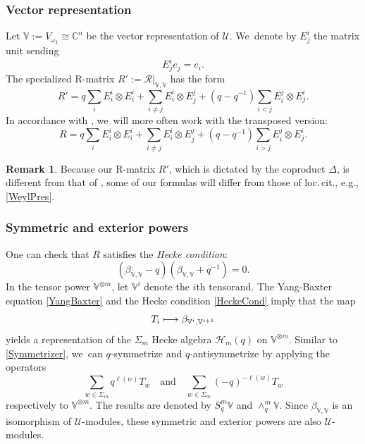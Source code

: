 \documentclass[11pt]{article}
\newcommand{\eg}{e.g.,\xspace}
\newcommand\mto{\mathchoice{\longmapsto}{\mapsto}{\mapsto}{\mapsto}}
\theoremstyle{definition}
\newtheorem{rem}[thm]{Remark}
\newcommand{\CC}{\mathbb{C}}
\newcommand{\Hecke}{\mathcal{H}}
\begin{document}
\subsubsection{Vector representation}
Let $\mathbb{V}:=V_{\omega_1}\cong \CC^n$ be the vector representation of $\mathcal{U}$. We~denote by $E_j^i$ the matrix unit sending
\[
E_{j}^ie_j=e_i.
\]
The specialized R-matrix $R':=\mathcal{R}\big|_{\mathbb{V},\mathbb{V}}$ has the form
\begin{equation*}
R'=q\sum_i E_{i}^i\otimes E_{i}^i+\sum_{i\not=j}E_{i}^i\otimes E_{j}^j+(q-q^{-1})\sum_{i<j}E_{i}^j\otimes E_{j}^i.
\end{equation*}
In accordance with \cite{JordanMult}, we~will more often work with the transposed version:
\begin{equation}
R=q\sum_i E_{i}^i\otimes E_{i}^i+\sum_{i\not=j}E_{i}^i\otimes E_{j}^j+(q-q^{-1})\sum_{i>j}E_{i}^j\otimes E_{j}^i.
\label{VecRMatrix}
\end{equation}

\begin{rem}
Because our R-matrix $R'$, which is dictated by the coproduct $\Delta$, is different from that of \cite{JordanMult}, some of our formulas will differ from those of loc.\,cit., \eg \eqref{WeylPres}.
\end{rem}

\subsubsection{Symmetric and exterior powers}
One can check that $R$ satisfies the \textit{Hecke condition}:
\begin{equation}
(\beta_{\mathbb{V},\mathbb{V}}-q)(\beta_{\mathbb{V},\mathbb{V}}+q^{-1})=0.
\label{HeckeCond}
\end{equation}
In the tensor power $\mathbb{V}^{\otimes m}$, let $\mathbb{V}^i$ denote the $i$th tensorand.
The Yang-Baxter equation \eqref{YangBaxter} and the Hecke condition \eqref{HeckeCond} imply that the map
\[
T_i\mto \beta_{\mathbb{V}^i,\mathbb{V}^{i+1}}
\]
yields a representation of the $\Sigma_m$ Hecke algebra $\Hecke_m(q)$ on $\mathbb{V}^{\otimes m}$.
Similar to \ref{Symmetrizer}, we~can $q$-symmetrize and $q$-antisymmetrize by applying the operators
\[
\sum_{w\in\Sigma_m}q^{\ell(w)}T_w\quad\text{and}\quad
\sum_{w\in\Sigma_m}(-q)^{-\ell(w)}T_w
\]
respectively to $\mathbb{V}^{\otimes m}$.
The results are denoted by $S_q^m\mathbb{V}$ and $\wedge_q^m\mathbb{V}$.
Since $\beta_{\mathbb{V},\mathbb{V}}$ is an isomorphism of $\mathcal{U}$-modules, these symmetric and exterior powers are also $\mathcal{U}$-modules.
\end{document}
